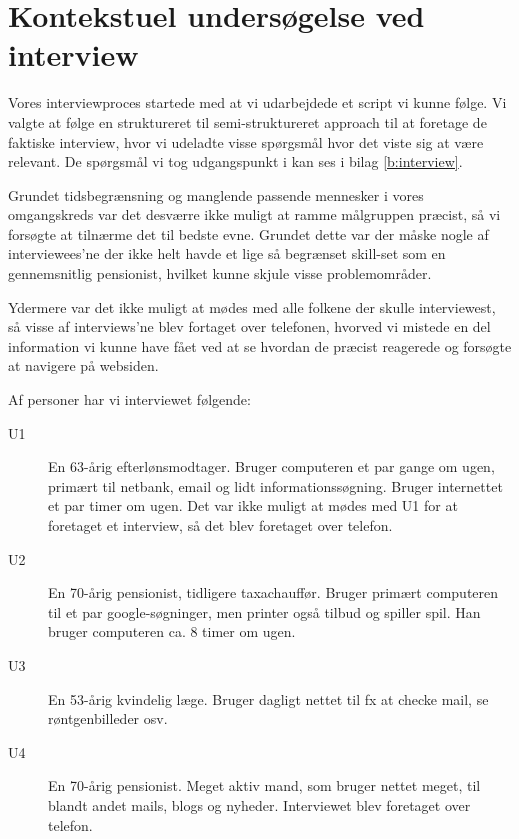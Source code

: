 \section{Kontekstuel undersøgelse ved interview}

Vores interviewproces startede med at vi udarbejdede et script vi kunne følge. Vi valgte at følge en struktureret til semi-struktureret approach til at foretage de faktiske interview, hvor vi udeladte visse spørgsmål hvor det viste sig at være relevant.\cite[s. 152]{Benyon2010} De spørgsmål vi tog udgangspunkt i kan ses i bilag \ref{b:interview}.

Grundet tidsbegrænsning og manglende passende mennesker i vores omgangskreds var det desværre ikke muligt at ramme målgruppen præcist, så vi forsøgte at tilnærme det til bedste evne. Grundet dette var der måske nogle af interviewees'ne der ikke helt havde et lige så begrænset skill-set som en gennemsnitlig pensionist, hvilket kunne skjule visse problemområder.

Ydermere var det ikke muligt at mødes med alle folkene der skulle interviewest, så visse af interviews'ne blev fortaget over telefonen, hvorved vi mistede en del information vi kunne have fået ved at se hvordan de præcist reagerede og forsøgte at navigere på websiden.

Af personer har vi interviewet følgende:

\begin{description}
    \item[U1] {
        En 63-årig efterlønsmodtager. Bruger computeren et par gange om ugen, primært til netbank, email og lidt informationssøgning. Bruger internettet et par timer om ugen. Det var ikke muligt at mødes med U1 for at foretaget et interview, så det blev foretaget over telefon.
    }
    \item[U2] {
        En 70-årig pensionist, tidligere taxachauffør. Bruger primært computeren til et par google-søgninger, men printer også tilbud og spiller spil. Han bruger computeren ca. 8 timer om ugen.
    }
    \item[U3] {
    En 53-årig kvindelig læge. Bruger dagligt nettet til fx at checke mail, se røntgenbilleder osv.
    }
    \item[U4] {
    En 70-årig pensionist. Meget aktiv mand, som bruger nettet meget, til blandt andet mails, blogs og nyheder. Interviewet blev foretaget over telefon.
    }
\end{description}
